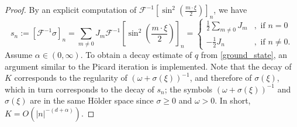 \documentclass[10pt,a4paper]{amsart}
\begin{document}
\begin{proof}
By an explicit computation of $\mathcal{F}^{-1} [\sin^2 \left(\frac{m \cdot \xi}{2}\right)]_n$, we have
\begin{equation}\label{fourier}
    s_n := [\mathcal{F}^{-1} \sigma]_n = \sum_{m \neq 0} J_{m} \mathcal{F}^{-1} [\sin^2 \left(\frac{m \cdot \xi}{2}\right)]_n =
    \begin{cases}
            \frac{1}{2} \sum\limits_{m \neq 0} J_{m}
            & ,\text{ if } n = 0\\
            -\frac{1}{2} J_{n} & ,\text{ if } n \neq 0.
    \end{cases}
\end{equation}
Assume $\alpha \in (0,\infty)$. To obtain a decay estimate of $q$ from \eqref{ground_state}, an argument similar to the Picard iteration is implemented. Note that the decay of $K$ corresponds to the regularity of $(\omega + \sigma(\xi))^{-1}$, and therefore of $\sigma(\xi)$, which in turn corresponds to the decay of $s_n$; the symbols $(\omega + \sigma(\xi))^{-1}$ and $\sigma(\xi)$ are in the same H\"older space since $\sigma \geq 0$ and $\omega > 0$. In short, $K = O(|n|^{-(d+\alpha)})$.


\end{proof}
\end{document}
